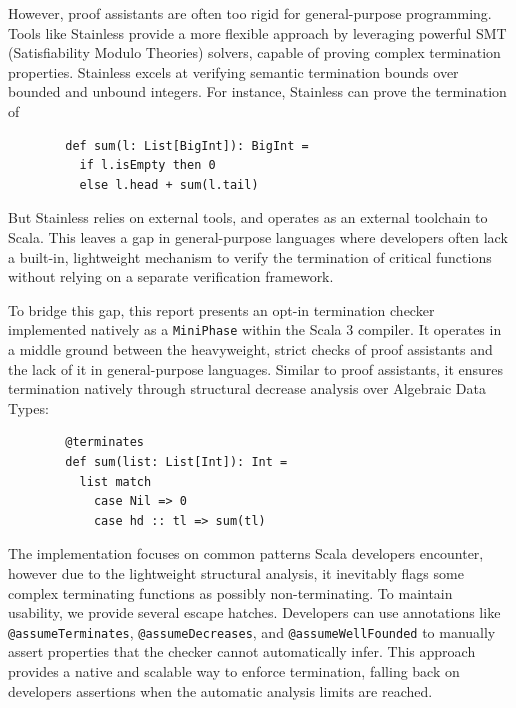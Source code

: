 However, proof assistants are often too rigid for general-purpose programming.
Tools like Stainless \cite{DBLP:journals/corr/abs-1904-03482} provide a more
flexible approach by leveraging powerful SMT (Satisfiability Modulo Theories)
solvers, capable of proving complex termination properties.
Stainless excels at verifying semantic termination bounds over bounded and
unbound integers. For instance, Stainless can prove the termination of
\begin{verbatim}
        def sum(l: List[BigInt]): BigInt =
          if l.isEmpty then 0
          else l.head + sum(l.tail)
\end{verbatim}
But Stainless relies on external tools, and operates as an external toolchain to
Scala. This leaves a gap in general-purpose languages where developers often
lack a built-in, lightweight mechanism to verify the termination of critical
functions without relying on a separate verification framework.

To bridge this gap, this report presents an opt-in termination checker
implemented natively as a \texttt{MiniPhase} within the Scala 3 compiler.
It operates in a middle ground between the heavyweight, strict checks of proof
assistants and the lack of it in general-purpose languages.
Similar to proof assistants, it ensures termination natively through structural
decrease analysis over Algebraic Data Types:
\newpage
\begin{verbatim}
        @terminates
        def sum(list: List[Int]): Int =
          list match
            case Nil => 0
            case hd :: tl => sum(tl)
\end{verbatim}
The implementation focuses on common patterns Scala developers encounter,
however due to the lightweight structural analysis, it inevitably flags some
complex terminating functions as possibly non-terminating. To maintain usability, we provide several
escape hatches. Developers can use annotations like \texttt{@assumeTerminates},
\texttt{@assumeDecreases}, and \texttt{@assumeWellFounded} to manually assert
properties that the checker cannot automatically infer. This approach provides a
native and scalable way to enforce termination, falling back on developers
assertions when the automatic analysis limits are reached.

